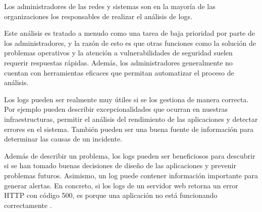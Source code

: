Los administradores de las redes y sistemas son en la mayoría de las
organizaciones los responsables de realizar el análisis de logs.

Este análisis es tratado a menudo como una tarea de baja prioridad por parte de
los administradores, y la razón de esto es que otras funciones como la solución
de problemas operativos y la atención a vulnerabilidades de seguridad suelen
requerir respuestas rápidas. Además, los administradores generalmente no
cuentan con herramientas eficaces que permitan automatizar el proceso de
análisis.

Los logs pueden ser realmente muy útiles si se los gestiona de manera correcta.
Por ejemplo pueden describir excepcionalidades que ocurran en nuestras
infraestructuras, permitir el análisis del rendimiento de las aplicaciones y
detectar errores en el sistema. También pueden ser una buena fuente de
información para determinar las causas de un incidente.

Además de describir un problema, los logs pueden ser beneficiosos para
descubrir si se han tomado buenas decisiones de diseño de las aplicaciones y
prevenir problemas futuros. Asimismo, un log puede contener información
importante para generar alertas. En concreto, si los logs de un servidor web
retorna un error HTTP con código 500, es porque una aplicación no está
funcionando correctamente
\cite[p.~30-31]{monitoreo:logging_and_log_management}.

